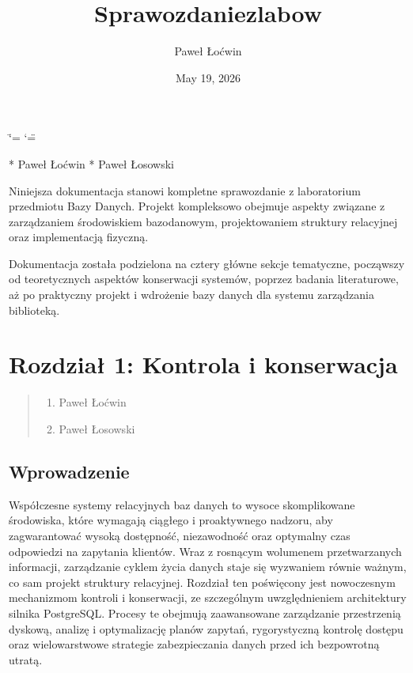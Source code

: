 \documentclass[letterpaper,10pt,english]{sphinxmanual}
\title{Sprawozdanie\sphinxhyphen{}z\sphinxhyphen{}labow}
\date{May 19, 2026}
\author{Paweł Łoćwin}
\begin{document}
\ifdefined\shorthandoff
  \ifnum\catcode`\=\string=\active\shorthandoff{=}\fi
  \ifnum\catcode`\"=\active{}\fi
\fi

\pagestyle{empty}
\sphinxmaketitle
\pagestyle{plain}
\sphinxtableofcontents
\pagestyle{normal}
\label{\detokenize{index::doc}}


\sphinxAtStartPar
{} * Paweł Łoćwin
* Paweł Łosowski

\sphinxAtStartPar
Niniejsza dokumentacja stanowi kompletne sprawozdanie z laboratorium przedmiotu Bazy Danych. Projekt kompleksowo obejmuje aspekty związane z zarządzaniem środowiskiem bazodanowym, projektowaniem struktury relacyjnej oraz implementacją fizyczną.

\sphinxAtStartPar
Dokumentacja została podzielona na cztery główne sekcje tematyczne, począwszy od teoretycznych aspektów konserwacji systemów, poprzez badania literaturowe, aż po praktyczny projekt i wdrożenie bazy danych dla systemu zarządzania biblioteką.

\sphinxstepscope


\chapter{Rozdział 1: Kontrola i konserwacja}
\label{\detokenize{rozdzial_1/index:rozdzial-1-kontrola-i-konserwacja}}\label{\detokenize{rozdzial_1/index::doc}}\begin{quote}\begin{description}
\begin{enumerate}
%
\item {} 
\sphinxAtStartPar
Paweł Łoćwin

\item {} 
\sphinxAtStartPar
Paweł Łosowski

\end{enumerate}

\end{description}\end{quote}


\section{Wprowadzenie}
\label{\detokenize{rozdzial_1/index:wprowadzenie}}
\sphinxAtStartPar
Współczesne systemy relacyjnych baz danych to wysoce skomplikowane środowiska, które wymagają ciągłego i proaktywnego nadzoru, aby zagwarantować wysoką dostępność, niezawodność oraz optymalny czas odpowiedzi na zapytania klientów. Wraz z rosnącym wolumenem przetwarzanych informacji, zarządzanie cyklem życia danych staje się wyzwaniem równie ważnym, co sam projekt struktury relacyjnej. Rozdział ten poświęcony jest nowoczesnym mechanizmom kontroli i konserwacji, ze szczególnym uwzględnieniem architektury silnika PostgreSQL. Procesy te obejmują zaawansowane zarządzanie przestrzenią dyskową, analizę i optymalizację planów zapytań, rygorystyczną kontrolę dostępu oraz wielowarstwowe strategie zabezpieczania danych przed ich bezpowrotną utratą.
\end{document}
